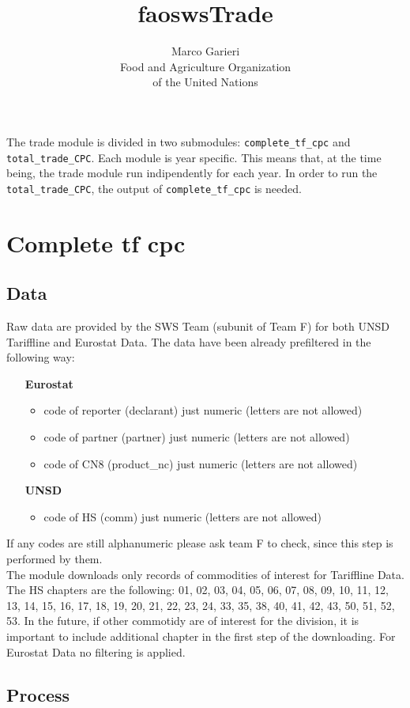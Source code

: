 \documentclass[nojss]{jss}\usepackage[]{graphicx}\usepackage[]{color}
\title{\bf faoswsTrade}
\author{Marco Garieri \\ Food and Agriculture Organization \\ of
  the United Nations}
\begin{document}
\newpage


The trade module is divided in two submodules: {\tt complete\_tf\_cpc} and {\tt total\_trade\_CPC}. Each module is year specific. This means that, at the time being, the trade module run indipendently for each year. In order to run the {\tt total\_trade\_CPC}, the output of {\tt complete\_tf\_cpc} is needed.

\section{Complete tf cpc}

\subsection{Data}
Raw data are provided by the SWS Team (subunit of Team F) for both UNSD Tariffline and Eurostat Data. The data have been already prefiltered in the following way:
\begin{itemize}
\item [\bf{Eurostat}]
\begin{itemize}
\item code of reporter (declarant) just numeric (letters are not allowed)
\item code of partner (partner) just numeric (letters are not allowed)
\item code of CN8 (product\_nc) just numeric (letters are not allowed)
\end{itemize}
\item [\bf{UNSD}]
\begin{itemize}
\item code of HS (comm) just numeric (letters are not allowed)
\end{itemize}
\end{itemize}
If any codes are still alphanumeric please ask team F to check, since this step is performed by them.\\
The module downloads only records of commodities of interest for Tariffline Data. The HS chapters are the following: 01, 02, 03, 04, 05, 06, 07, 08, 09, 10, 11, 12, 13, 14, 15, 16, 17, 18, 19, 20, 21, 22, 23, 24, 33, 35, 38, 40, 41, 42, 43, 50, 51, 52, 53. In the future, if other commotidy are of interest for the division, it is important to include additional chapter in the first step of the downloading. For Eurostat Data no filtering is applied.


\subsection{Process}
\end{document}
